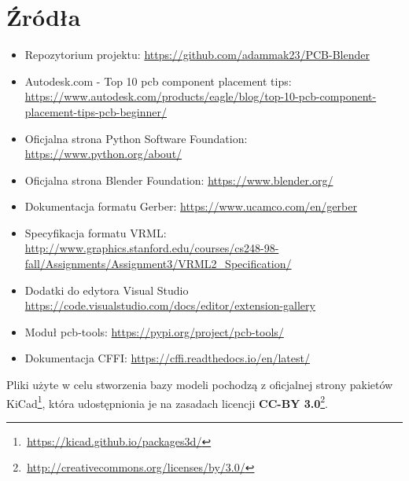 \documentclass{xmgr}
\begin{document}
\chapter{Źródła} \label{linki}
\begin{itemize}
\item Repozytorium projektu: \url{https://github.com/adammak23/PCB-Blender}
\item Autodesk.com - Top 10 pcb component placement tips: \url{https://www.autodesk.com/products/eagle/blog/top-10-pcb-component-placement-tips-pcb-beginner/}
\item Oficjalna strona Python Software Foundation: \url{https://www.python.org/about/}
\item Oficjalna strona Blender Foundation: \url{https://www.blender.org/}
\item Dokumentacja formatu Gerber: \url{https://www.ucamco.com/en/gerber}
\item Specyfikacja formatu VRML: \url{http://www.graphics.stanford.edu/courses/cs248-98-fall/Assignments/Assignment3/VRML2_Specification/}
\item Dodatki do edytora Visual Studio \url{https://code.visualstudio.com/docs/editor/extension-gallery}
\item Moduł pcb-tools: \url{https://pypi.org/project/pcb-tools/}
\item Dokumentacja CFFI: \url{https://cffi.readthedocs.io/en/latest/}
\end{itemize}

\vspace{10mm}

\noindent Pliki użyte w celu stworzenia bazy modeli pochodzą z oficjalnej strony pakietów KiCad\footnote{\,\url{https://kicad.github.io/packages3d/}}, która udostępnionia je na zasadach licencji \textbf{CC-BY 3.0}\footnote{\,\url{http://creativecommons.org/licenses/by/3.0/}}.
\vspace{10mm}
\end{document}
